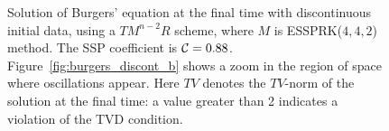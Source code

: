 \begin{figure}
    \centering
    \caption{Solution of Burgers' equation at the final time with discontinuous initial data, using a
    $TM^{n-2}R$ scheme, where $M$ is ESSPRK($4,4,2$) method. 
    The SSP coefficient is $ \mathcal{C} = 0.88$. 
    Figure~\ref{fig:burgers_discont_b} shows a zoom in the region of space where
    oscillations appear.
    Here $TV$ denotes the $TV$-norm of the solution at the final time:
    a value greater than 2 indicates a violation of the TVD condition.
    }
    \label{fig:burgers_discont}
\end{figure}

